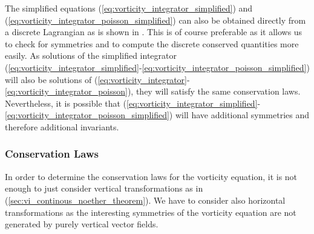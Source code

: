 \documentclass[12pt,a4paper,reqno]{article}
\begin{document}
The simplified equations (\ref{eq:vorticity_integrator_simplified}) and (\ref{eq:vorticity_integrator_poisson_simplified}) can also be obtained directly from a discrete Lagrangian as is shown in \cite{KrausMajSonnendruecker:2015}.
This is of course preferable as it allows us to check for symmetries and to compute the discrete conserved quantities more easily.
As solutions of the simplified integrator (\ref{eq:vorticity_integrator_simplified}-\ref{eq:vorticity_integrator_poisson_simplified}) will also be solutions of (\ref{eq:vorticity_integrator}-\ref{eq:vorticity_integrator_poisson}), they will satisfy the same conservation laws.
Nevertheless, it is possible that (\ref{eq:vorticity_integrator_simplified}-\ref{eq:vorticity_integrator_poisson_simplified}) will have additional symmetries and therefore additional invariants.

\subsubsection{Conservation Laws}

In order to determine the conservation laws for the vorticity equation, it is not enough to just consider vertical transformations as in (\ref{sec:vi_continous_noether_theorem}). We have to consider also horizontal transformations as the interesting symmetries of the vorticity equation are not generated by purely vertical vector fields.
\end{document}
